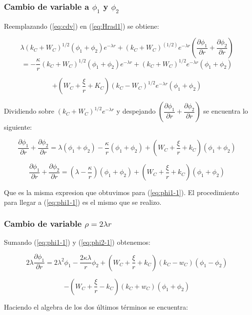 \documentclass[a4paper, 12pt]{article} %
\begin{document}
\subsubsection{Cambio de variable a $\phi_1$ y $\phi_2$}

Reemplazando (\ref{eq:cdv}) en (\ref{eq:Hrad1})  se obtiene:

\[
\lambda (k_C + W_C)^{1/2}(\phi_1 + \phi_2)e^{-\lambda r} + (k_C + W_C)^(1/2)e^{-\lambda r}\left( \dfrac{\partial \phi_1}{\partial r} 
+ \dfrac{\partial \phi_2}{\partial r} \right)
\]
\[
 = - \dfrac{\kappa}{r}  (k_C + W_C)^{1/2}(\phi_1 + \phi_2)e^{-\lambda r} 
+ (k_C + W_C)^{1/2}e^{-\lambda r} (\phi_1 + \phi_2)
\]

\[
+ \left ( W_C + \dfrac{\xi}{r} + K_C \right )(k_C - W_C)^{1/2}e^{-\lambda r}(\phi_1 + \phi_2)
\]


Dividiendo sobre $(k_C + W_C)^{1/2}e^{-\lambda r}$ y despejando $\left( \dfrac{\partial \phi_1}{\partial r} 
+ \dfrac{\partial \phi_2}{\partial r} \right)$ se encuentra lo siguiente:

\[
\dfrac{\partial \phi_1}{\partial r} + \dfrac{\partial \phi_2}{\partial r} = \lambda (\phi_1 + \phi_2) - \dfrac{\kappa}{r}(\phi_1 + \phi_2)
+\left( W_C + \dfrac{\xi}{r} + k_C  \right)(\phi_1 + \phi_2) 
\]

\begin{equation}
\dfrac{\partial \phi_1}{\partial r} + \dfrac{\partial \phi_2}{\partial r} = \left ( \lambda - \dfrac{\kappa}{r} \right ) (\phi_1 + \phi_2)
+\left( W_C + \dfrac{\xi}{r} + k_C  \right)(\phi_1 + \phi_2) 
\end{equation}

Que es la misma expresion que obtuvimos para (\ref{eq:phi1-1}). El procedimiento para llegar a (\ref{eq:phi1-1}) es el mismo que se realizo.

 
\subsubsection{Cambio de variable $\rho=2\lambda r$} 

Sumando  (\ref{eq:phi1-1}) y  (\ref{eq:phi2-1}) obtenemos:

\[
2 \lambda \dfrac{\partial \phi_1}{\partial r} = 2 \lambda^2  \phi_1 
- \dfrac{2 \kappa \lambda }{r}\phi_2 + \left( W_C + \dfrac{\xi}{r} + k_C  \right ) 
(k_C - w_C)(\phi_1 - \phi_2) 
\]

\[
- \left( W_C + \dfrac{\xi}{r} - k_C  \right )(k_C + w_C)(\phi_1 + \phi_2) 
\]

Haciendo el algebra de los dos \'ultimos t\'erminos se encuentra:
\end{document}
